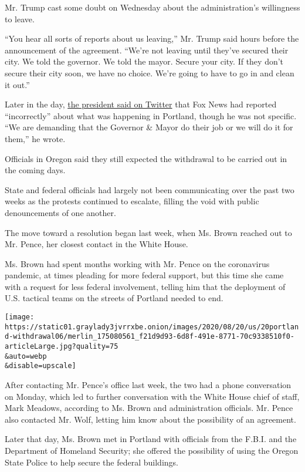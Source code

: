 Mr. Trump cast some doubt on Wednesday about the administration's
willingness to leave.

``You hear all sorts of reports about us leaving,'' Mr. Trump said hours
before the announcement of the agreement. ``We're not leaving until
they've secured their city. We told the governor. We told the mayor.
Secure your city. If they don't secure their city soon, we have no
choice. We're going to have to go in and clean it out.''

Later in the day,
\href{https://twitter.com/realDonaldTrump/status/1288599151349923840}{the
president said on Twitter} that Fox News had reported ``incorrectly''
about what was happening in Portland, though he was not specific. ``We
are demanding that the Governor \& Mayor do their job or we will do it
for them,'' he wrote.

Officials in Oregon said they still expected the withdrawal to be
carried out in the coming days.

State and federal officials had largely not been communicating over the
past two weeks as the protests continued to escalate, filling the void
with public denouncements of one another.

The move toward a resolution began last week, when Ms. Brown reached out
to Mr. Pence, her closest contact in the White House.

Ms. Brown had spent months working with Mr. Pence on the coronavirus
pandemic, at times pleading for more federal support, but this time she
came with a request for less federal involvement, telling him that the
deployment of U.S. tactical teams on the streets of Portland needed to
end.

\texttt{[image: https://static01.graylady3jvrrxbe.onion/images/2020/08/20/us/20portland-withdrawal06/merlin\_175080561\_f21d9d93-6d8f-491e-8771-70c9338510f0-articleLarge.jpg?quality=75\\\&auto=webp\\\&disable=upscale]}

After contacting Mr. Pence's office last week, the two had a phone
conversation on Monday, which led to further conversation with the White
House chief of staff, Mark Meadows, according to Ms. Brown and
administration officials. Mr. Pence also contacted Mr. Wolf, letting him
know about the possibility of an agreement.

Later that day, Ms. Brown met in Portland with officials from the F.B.I.
and the Department of Homeland Security; she offered the possibility of
using the Oregon State Police to help secure the federal buildings.

